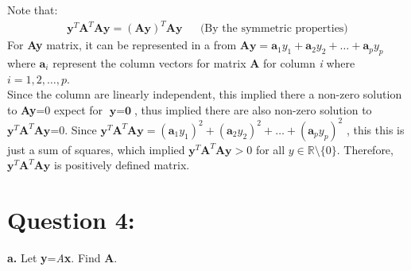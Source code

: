 \documentclass[12 pt, a4paper]{article}
\begin{document}
\noindent Note that: 
\begin{align*}
\textbf{y}^T\textbf{A}^T \textbf{Ay} =( \textbf{Ay})^T \textbf{Ay} & &\text{(By the symmetric properties)}
\end{align*}
For \textbf{Ay} matrix, it can be represented in a from $\textbf{Ay}=\textbf{a}_1y_1+\textbf{a}_2 y_2+\ldots+\textbf{a}_py_p$ where $\textbf{a}_i$ represent the column vectors for matrix \textbf{A} for column \textit{i} where $i = 1,2,\ldots, p$. \\

\noindent Since the column are linearly independent, this implied there a non-zero solution to \textbf{Ay}=0 expect for $\textbf{y}=\textbf{0}$, thus implied there are also non-zero solution to$\textbf{y}^T\textbf{A}^T \textbf{Ay}$=0. Since $\textbf{y}^T\textbf{A}^T \textbf{Ay}=(\textbf{a}_1y_1)^2+(\textbf{a}_2 y_2)^2+\ldots+(\textbf{a}_py_p)^2$ , this this is just a sum of squares,  which implied $\textbf{y}^T\textbf{A}^T \textbf{Ay} > 0$ for all $y \in \mathbb{R} \setminus \{0\}$. Therefore,  $\textbf{y}^T\textbf{A}^T \textbf{Ay}$ is positively defined matrix.

\section*{Question 4:}
\textbf{a.} Let \textbf{y}=\textit{A}\textbf{x}. Find \textbf{A}.\\
\end{document}
